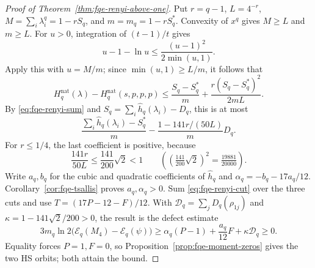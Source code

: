 \begin{proof}[Proof of Theorem~\ref{thm:fqe-renyi-above-one}]
Put $r=q-1$, $L=4^{-r}$, $M=\sum_i\lambda_i^q=1-rS_q$,
and $m=m_q=1-rS_q^*$. Convexity of $x^q$ gives $M\ge L$ and $m\ge L$.
For $u>0$, integration of $(t-1)/t$ gives
\[
u-1-\ln u\le\frac{(u-1)^2}{2\min(u,1)}.
\]
Apply this with $u=M/m$; since $\min(u,1)\ge L/m$, it follows that
\[
H_q^{\mathrm{nat}}(\lambda)-H_q^{\mathrm{nat}}(s,p,p,p)
\le\frac{S_q-S_q^*}{m}+
\frac{r(S_q-S_q^*)^2}{2mL}.
\]
By \eqref{eq:fqe-renyi-sum} and $S_q=\sum_i \widehat h_q(\lambda_i)-D_q$, this is at most
\[
\frac{\sum_i \widehat h_q(\lambda_i)-S_q^*}{m}
-\frac{1-141r/(50L)}{m}D_q.
\tag{RD}\label{eq:fqe-renyi-cut}
\]
For $r\le1/4$, the last coefficient is positive, because
\[
\frac{141r}{50L}\le\frac{141}{200}\sqrt2<1
\qquad\left(\left(\tfrac{141}{200}\sqrt2\right)^2=\tfrac{19881}{20000}\right).
\]
Write $a_q,b_q$ for the cubic and quadratic coefficients of $\widehat h_q$ and
$\alpha_q=-b_q-17a_q/12$. Corollary~\ref{cor:fqe-tsallis} proves
$a_q,\alpha_q>0$. Sum \eqref{eq:fqe-renyi-cut} over the three cuts and
use $T=(17P-12-F)/12$. With $\mathcal D_q=\sum_jD_q(\rho_{1j})$ and
$\kappa=1-141\sqrt2/200>0$, the result is the defect estimate
\[
3m_q\ln2\bigl(\mathcal E_q(M_4)-\mathcal E_q(\psi)\bigr)
\ge\alpha_q(P-1)+\frac{a_q}{12}F+\kappa\mathcal D_q\ge0.
\tag{RE}\label{eq:fqe-renyi-defect}
\]
Equality forces $P=1,F=0$, so Proposition~\ref{prop:fqe-moment-zeros} gives the two HS
orbits; both attain the bound.
\end{proof}
